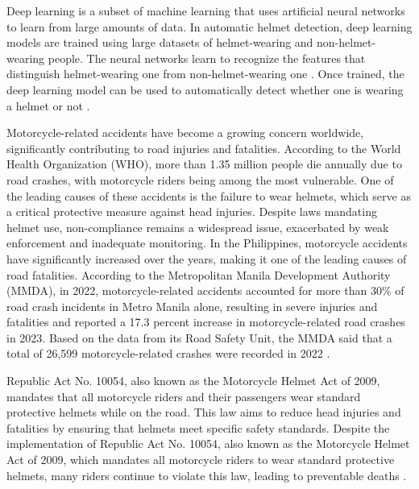 \begin{refsection}
Deep learning is a subset of machine learning that uses artificial neural networks to learn from large amounts of data. In automatic helmet detection, deep learning models are trained using large datasets of helmet-wearing and non-helmet-wearing people. The neural networks learn to recognize the features that distinguish helmet-wearing one from non-helmet-wearing one . Once trained, the deep learning model can be used to automatically detect whether one is wearing a helmet or not \cite{Thakur2024}.


Motorcycle-related accidents have become a growing concern worldwide, significantly contributing to road injuries and fatalities. According to the World Health Organization (WHO), more than 1.35 million people die annually due to road crashes, with motorcycle riders being among the most vulnerable. One of the leading causes of these accidents is the failure to wear helmets, which serve as a critical protective measure against head injuries. Despite laws mandating helmet use, non-compliance remains a widespread issue, exacerbated by weak enforcement and inadequate monitoring. In the Philippines, motorcycle accidents have significantly increased over the years, making it one of the leading causes of road fatalities. According to the Metropolitan Manila Development Authority (MMDA), in 2022, motorcycle-related accidents accounted for more than 30\% of road crash incidents in Metro Manila alone, resulting in severe injuries and fatalities and reported a 17.3 percent increase in motorcycle-related road crashes in 2023. Based on the data from its Road Safety Unit, the MMDA said that a total of 26,599 motorcycle-related crashes were recorded in 2022 \cite{MMDA2023}.


Republic Act No. 10054, also known as the Motorcycle Helmet Act of 2009, mandates that all motorcycle riders and their passengers wear standard protective helmets while on the road. This law aims to reduce head injuries and fatalities by ensuring that helmets meet specific safety standards. Despite the implementation of Republic Act No. 10054, also known as the Motorcycle Helmet Act of 2009, which mandates all motorcycle riders to wear standard protective helmets, many riders continue to violate this law, leading to preventable deaths \cite{Republic2009}.



\end{refsection}
